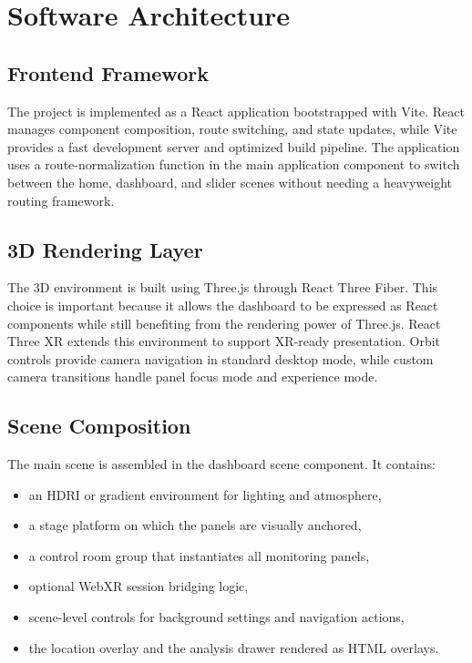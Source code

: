 \documentclass[conference]{IEEEtran}
\begin{document}
\section{Software Architecture}
\subsection{Frontend Framework}
The project is implemented as a React application bootstrapped with Vite. React manages component composition, route switching, and state updates, while Vite provides a fast development server and optimized build pipeline. The application uses a route-normalization function in the main application component to switch between the home, dashboard, and slider scenes without needing a heavyweight routing framework.

\subsection{3D Rendering Layer}
The 3D environment is built using Three.js through React Three Fiber. This choice is important because it allows the dashboard to be expressed as React components while still benefiting from the rendering power of Three.js. React Three XR extends this environment to support XR-ready presentation. Orbit controls provide camera navigation in standard desktop mode, while custom camera transitions handle panel focus mode and experience mode.

\subsection{Scene Composition}
The main scene is assembled in the dashboard scene component. It contains:
\begin{itemize}
\item an HDRI or gradient environment for lighting and atmosphere,
\item a stage platform on which the panels are visually anchored,
\item a control room group that instantiates all monitoring panels,
\item optional WebXR session bridging logic,
\item scene-level controls for background settings and navigation actions,
\item the location overlay and the analysis drawer rendered as HTML overlays.
\end{itemize}
\end{document}
